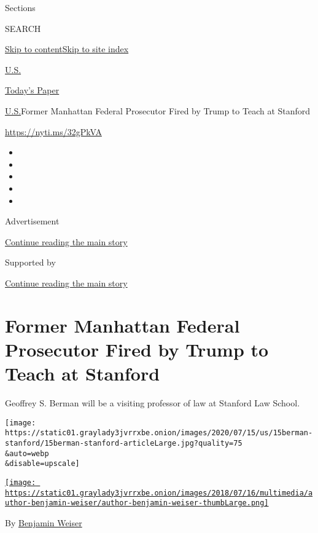 Sections

SEARCH

\protect\hyperlink{site-content}{Skip to
content}\protect\hyperlink{site-index}{Skip to site index}

\href{https://www.nytimes3xbfgragh.onion/section/us}{U.S.}

\href{https://myaccount.nytimes3xbfgragh.onion/auth/login?response_type=cookie\&client_id=vi}{}

\href{https://www.nytimes3xbfgragh.onion/section/todayspaper}{Today's
Paper}

\href{/section/us}{U.S.}\textbar{}Former Manhattan Federal Prosecutor
Fired by Trump to Teach at Stanford

\url{https://nyti.ms/32gPkVA}

\begin{itemize}
\item
\item
\item
\item
\item
\end{itemize}

Advertisement

\protect\hyperlink{after-top}{Continue reading the main story}

Supported by

\protect\hyperlink{after-sponsor}{Continue reading the main story}

\hypertarget{former-manhattan-federal-prosecutor-fired-by-trump-to-teach-at-stanford}{%
\section{Former Manhattan Federal Prosecutor Fired by Trump to Teach at
Stanford}\label{former-manhattan-federal-prosecutor-fired-by-trump-to-teach-at-stanford}}

Geoffrey S. Berman will be a visiting professor of law at Stanford Law
School.

\texttt{[image: https://static01.graylady3jvrrxbe.onion/images/2020/07/15/us/15berman-stanford/15berman-stanford-articleLarge.jpg?quality=75\\\&auto=webp\\\&disable=upscale]}

\href{https://www.nytimes3xbfgragh.onion/by/benjamin-weiser}{\texttt{[image: https://static01.graylady3jvrrxbe.onion/images/2018/07/16/multimedia/author-benjamin-weiser/author-benjamin-weiser-thumbLarge.png]}}

By \href{https://www.nytimes3xbfgragh.onion/by/benjamin-weiser}{Benjamin
Weiser}

